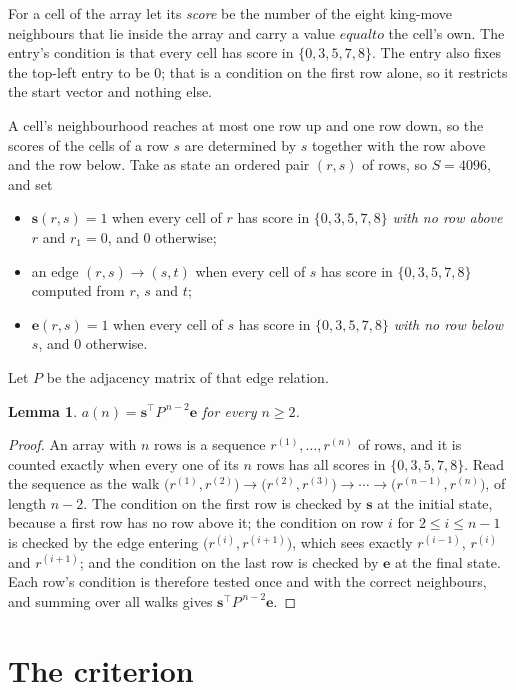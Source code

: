 \documentclass[11pt,a4paper]{article}
\theoremstyle{plain}
\newtheorem{lemma}[theorem]{Lemma}
\theoremstyle{definition}
\begin{document}
For a cell of the array let its \emph{score} be the number of the eight king-move neighbours that lie inside
the array and carry a value $equal to$ the cell's own. The entry's condition is that every cell
has score in $\{0,3,5,7,8\}$. The entry also fixes the top-left entry to be $0$; that is a condition on the first row alone, so it restricts the start vector and nothing else.

A cell's neighbourhood reaches at most one row up and one row down, so the scores of the
cells of a row $s$ are determined by $s$ together with the row above and the row below.
Take as state an ordered pair $(r,s)$ of rows, so $S=4096$, and set
\begin{itemize}
\item $\mathbf{s}(r,s)=1$ when every cell of $r$ has score in $\{0,3,5,7,8\}$ \emph{with no row
above $r$} and $r_1=0$, and $0$ otherwise;
\item an edge $(r,s)\to(s,t)$ when every cell of $s$ has score in $\{0,3,5,7,8\}$ computed from
$r$, $s$ and $t$;
\item $\mathbf{e}(r,s)=1$ when every cell of $s$ has score in $\{0,3,5,7,8\}$ \emph{with no row
below $s$}, and $0$ otherwise.
\end{itemize}
Let $P$ be the adjacency matrix of that edge relation.

\begin{lemma}\label{lem:walk}
$a(n)=\mathbf{s}^{\!\top}P^{\,n-2}\mathbf{e}$ for every $n\ge2$.
\end{lemma}

\begin{proof}
An array with $n$ rows is a sequence $r^{(1)},\dots,r^{(n)}$ of rows, and it is counted
exactly when every one of its $n$ rows has all scores in $\{0,3,5,7,8\}$. Read the sequence as the
walk $\bigl(r^{(1)},r^{(2)}\bigr)\to\bigl(r^{(2)},r^{(3)}\bigr)\to\cdots\to
\bigl(r^{(n-1)},r^{(n)}\bigr)$, of length $n-2$. The condition on the first row is
checked by $\mathbf{s}$ at the initial state, because a first row has no row above it; the
condition on row $i$ for $2\le i\le n-1$ is checked by the edge entering
$\bigl(r^{(i)},r^{(i+1)}\bigr)$, which sees exactly $r^{(i-1)}$, $r^{(i)}$ and
$r^{(i+1)}$; and the condition on the last row is checked by $\mathbf{e}$ at the final
state. Each row's condition is therefore tested once and with the correct neighbours, and
summing over all walks gives $\mathbf{s}^{\!\top}P^{\,n-2}\mathbf{e}$.
\end{proof}

\section{The criterion}
\end{document}
